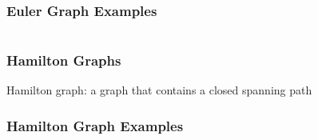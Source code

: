 \documentclass[dvipsnames]{beamer}
\begin{document}
\begin{frame}
  \frametitle{Euler Graph Examples}

  \begin{columns}
    \begin{example}
      \begin{center}
      \end{center}
    \end{example}

    \begin{example}
      \begin{center}
      \end{center}
    \end{example}
  \end{columns}
\end{frame}

\begin{frame}
  \frametitle{Hamilton Graphs}

  \begin{definition}
    \alert{Hamilton graph}: a graph that contains a closed spanning path
  \end{definition}
\end{frame}

\begin{frame}
  \frametitle{Hamilton Graph Examples}

  \begin{columns}
    \begin{example}
      \begin{center}
      \end{center}
    \end{example}

    \begin{example}
      \begin{center}
      \end{center}
    \end{example}
  \end{columns}
\end{frame}
\end{document}
